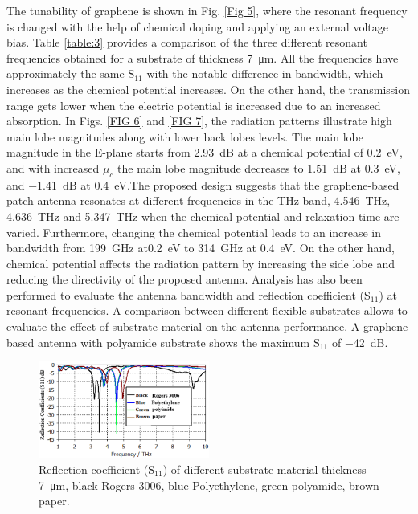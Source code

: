 \documentclass[12pt]{suhbook}
\begin{document}
The tunability of graphene is shown in Fig. \ref{Fig 5}, where the resonant frequency is changed with the help of chemical doping and applying an external voltage bias. Table \ref{table:3} provides a comparison of the three different resonant frequencies obtained for a substrate of thickness \SI{7}{\um}. All the frequencies have approximately the same $\mathrm{S_{11}}$ with the notable difference in bandwidth, which increases as the chemical potential increases. On the other hand, the transmission range gets lower when the electric potential is increased due to an increased absorption. In Figs. \ref{FIG 6} and \ref{FIG 7}, the radiation patterns illustrate high main lobe magnitudes along with lower back lobes levels. The main lobe magnitude in the E-plane starts from \SI{2.93}{\dB} at a chemical potential of \SI{0.2}{\eV}, and with increased $\mu_c$ the main lobe magnitude decreases to \SI{1.51}{\dB} at \SI{0.3}{\eV}, and \SI{-1.41}{\dB} at \SI{0.4}{\eV}.The proposed design suggests that the graphene-based patch antenna resonates at different frequencies in the THz band, \SI{4.546}{\THz}, \SI{4.636}{\THz} and \SI{5.347}{\THz} when the chemical potential and relaxation time are varied. Furthermore, changing the chemical potential leads to an increase in bandwidth from \SI{199}{\GHz} at\SI{0.2}{\eV} to \SI{314}{\GHz} at \SI{0.4}{\eV}. On the other hand, chemical potential affects the radiation pattern by increasing the side lobe and reducing the directivity of the proposed antenna. Analysis has also been performed to evaluate the antenna bandwidth and reflection coefficient ($\mathrm{S_{11}}$) at resonant frequencies. A comparison between different flexible substrates allows to evaluate the effect of substrate material on the antenna performance. A graphene-based antenna with polyamide substrate shows the maximum $\mathrm{S_{11}}$ of \SI{-42}{\dB}.
% 
\begin{figure}[hbt!]
\centering
\includegraphics[width=0.5\textwidth]{4}
\caption{Reflection coefficient ($\mathrm{S_{11}}$) of different substrate material thickness \SI{7}{\um}, black Rogers 3006, blue Polyethylene, green polyamide, brown paper.}
\label{Fig 4}
\end{figure}
\end{document}
